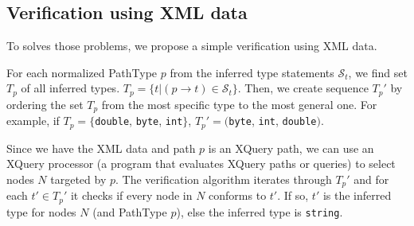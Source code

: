 \subsection{Verification using XML data}
To solves those problems, we propose a simple verification using XML data.

For each normalized PathType $p$ from the inferred type statements $\mathcal{S}_t$, we find set $T_p$ of all inferred types. $T_p = \{t|(p \rightarrow t) \in \mathcal{S}_t\}$. Then, we create sequence $T_p'$ by ordering the set $T_p$ from the most specific type to the most general one. For example, if $T_p = \{$\texttt{double}, \texttt{byte}, \texttt{int}$\}$, $T_p' = ($\texttt{byte}, \texttt{int}, \texttt{double}$)$.

Since we have the XML data and path $p$ is an XQuery path, we can use an XQuery processor (a program that evaluates XQuery paths or queries) to select nodes $N$ targeted by $p$. The verification algorithm iterates through $T_p'$ and for each $t' \in T_p'$ it checks if every node in $N$ conforms to $t'$. If so, $t'$ is the inferred type for nodes $N$ (and PathType $p$), else the inferred type is \texttt{string}.
